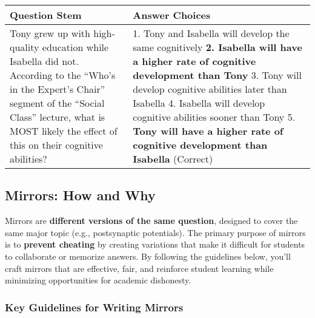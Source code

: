\documentclass[
]{article}
\begin{document}
\begin{longtable}[]{@{}ll@{}}
\toprule
\begin{minipage}[b]{0.30\columnwidth}\raggedright
\textbf{Question Stem}\strut
\end{minipage} & \begin{minipage}[b]{0.64\columnwidth}\raggedright
\textbf{Answer Choices}\strut
\end{minipage}\tabularnewline
\midrule
\endhead
\begin{minipage}[t]{0.30\columnwidth}\raggedright
Tony grew up with high-quality education while Isabella did not. According to the ``Who's in the Expert's Chair'' segment of the ``Social Class'' lecture, what is MOST likely the effect of this on their cognitive abilities?\strut
\end{minipage} & \begin{minipage}[t]{0.64\columnwidth}\raggedright
1. Tony and Isabella will develop the same cognitively \textbf{2. Isabella will have a higher rate of cognitive development than Tony} 3. Tony will develop cognitive abilities later than Isabella 4. Isabella will develop cognitive abilities sooner than Tony 5. \textbf{Tony will have a higher rate of cognitive development than Isabella} (Correct)\strut
\end{minipage}\tabularnewline
\bottomrule
\end{longtable}

\hypertarget{mirrors-how-and-why}{%
\subsection{Mirrors: How and Why}\label{mirrors-how-and-why}}

Mirrors are \textbf{different versions of the same question}, designed to cover the same major topic (e.g., postsynaptic potentials). The primary purpose of mirrors is to \textbf{prevent cheating} by creating variations that make it difficult for students to collaborate or memorize answers. By following the guidelines below, you'll craft mirrors that are effective, fair, and reinforce student learning while minimizing opportunities for academic dishonesty.

\hypertarget{key-guidelines-for-writing-mirrors}{%
\subsubsection{Key Guidelines for Writing Mirrors}\label{key-guidelines-for-writing-mirrors}}
\end{document}
